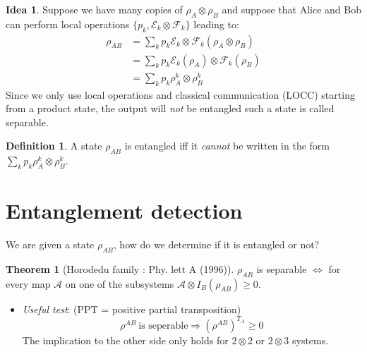 \documentclass[12pt]{book}
\theoremstyle{definition}
\newtheorem*{defi}{\bfseries Definition}
\newtheorem*{theo}{\bfseries Theorem}
\newtheorem*{idea}{\bfseries Idea}
\let\oldsum\sum
\renewcommand{\sum}[2]{\oldsum\limits_{#1}^{#2}}
\newcommand{\para}[1]{\left( {#1} \right)}
\begin{document}
\begin{idea}
  Suppose we have many copies of $\rho_A \otimes \rho_B$ and suppose that Alice and Bob can perform  local operations $\{p_k, \mathcal E_k \otimes \mathcal F_k\}$ leading to:
  \begin{align*}
    \rho_{AB} & = \oldsum_k p_k \mathcal E_k \otimes \mathcal F_k (\rho_A \otimes \rho_B) \\
    & = \oldsum_k p_k \mathcal E_k(\rho_A) \otimes \mathcal F_k(\rho_B) \\
    & = \oldsum_k p_k \rho_A^k \otimes \rho_B^k
  \end{align*}
  Since we only use local operations and classical communication (LOCC) starting from a product state, the output will \emph{not} be entangled such a state is called separable.
\end{idea}

\begin{defi}
    A state $\rho_{AB}$ is entangled iff it \emph{cannot} be written in the form $\oldsum_k p_k \rho_A^k \otimes \rho_B^k$.
\end{defi}

\section{Entanglement detection}
We are given a state $\rho_{AB}$, how do we determine if it is entangled or not?
\begin{theo}[Horodedu family : Phy. lett A (1996)]

  $\rho_{AB}$ is separable $\iff$ for every  map $\mathcal A$ on one of the subsystems $\mathcal A \otimes I_B (\rho_{AB}) \geq 0$.
  \end{theo}
\begin{itemize}
  \item \emph{Useful test}: (PPT = positive partial transposition) \\
  \begin{equation}
    \rho^{AB}\: \textrm{is seperable} \Longrightarrow \para{\rho^{AB}}^{T_A} \geq 0
  \end{equation}
  The implication to the other side only holds for $2 \otimes 2$ or $2 \otimes 3$ systems.
\end{itemize}
\end{document}
